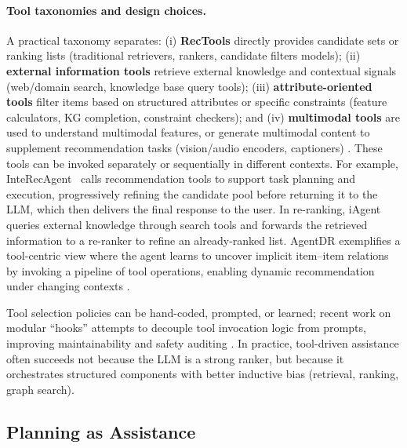 {{\paragraph{\textbf{Tool taxonomies and design choices.}}
A practical taxonomy separates:
(i) \textbf{RecTools} directly provides candidate sets or ranking lists (\eg traditional retrievers, rankers, candidate filters models); 
(ii) \textbf{external information tools} retrieve external knowledge and contextual signals (\eg web/domain search, knowledge base query tools); 
(iii) \textbf{attribute-oriented tools} filter items based on structured attributes or specific constraints (\eg feature calculators, KG completion, constraint checkers); 
and (iv) \textbf{multimodal tools} are used to understand multimodal features, or generate multimodal content to supplement recommendation tasks (\eg vision/audio encoders, captioners) \cite{zhao2024toolrec,huang2024interecagent,yang2025agentdr,shen2023hugginggpt,schick2023toolformer,shi2025ocgagent}. 
These tools can be invoked separately or sequentially in different contexts. 
For example, InteRecAgent~\cite{huang2024interecagent} calls recommendation tools to support task planning and execution, progressively refining the candidate pool before returning it to the LLM, which then delivers the final response to the user. 
In re-ranking, iAgent~\cite{xu2025iagent} queries external knowledge through search tools and forwards the retrieved information to a re-ranker to refine an already-ranked list. 
AgentDR exemplifies a tool-centric view where the agent learns to uncover implicit item--item relations by invoking a pipeline of tool operations, enabling dynamic recommendation under changing contexts \cite{yang2025agentdr}. 
{Tool selection policies can be hand-coded, prompted, or learned; recent work on modular ``hooks'' attempts to decouple tool invocation logic from prompts, improving maintainability and safety auditing \cite{de2024language}.
In practice, tool-driven assistance often succeeds not because the LLM is a strong ranker, but because it orchestrates structured components with better inductive bias (retrieval, ranking, graph search).


\subsection{Planning as Assistance}
\label{sec:assist-planning}

}}}

